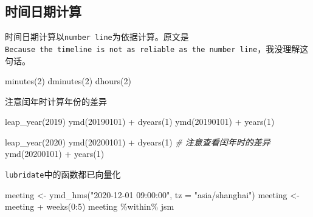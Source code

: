 \documentclass[
]{book}
\newenvironment{Shaded}{\begin{snugshade}}{\end{snugshade}}
\newcommand{\AttributeTok}[1]{\textcolor[rgb]{0.77,0.63,0.00}{#1}}
\newcommand{\CommentTok}[1]{\textcolor[rgb]{0.56,0.35,0.01}{\textit{#1}}}
\newcommand{\DecValTok}[1]{\textcolor[rgb]{0.00,0.00,0.81}{#1}}
\newcommand{\FunctionTok}[1]{\textcolor[rgb]{0.00,0.00,0.00}{#1}}
\newcommand{\NormalTok}[1]{#1}
\newcommand{\OtherTok}[1]{\textcolor[rgb]{0.56,0.35,0.01}{#1}}
\newcommand{\SpecialCharTok}[1]{\textcolor[rgb]{0.00,0.00,0.00}{#1}}
\newcommand{\StringTok}[1]{\textcolor[rgb]{0.31,0.60,0.02}{#1}}
\begin{document}
\hypertarget{ux65f6ux95f4ux65e5ux671fux8ba1ux7b97}{%
\subsection{时间日期计算}\label{ux65f6ux95f4ux65e5ux671fux8ba1ux7b97}}

时间日期计算以\texttt{number\ line}为依据计算。原文是\texttt{Because\ the\ timeline\ is\ not\ as\ reliable\ as\ the\ number\ line}，我没理解这句话。

\begin{Shaded}
\begin{Highlighting}[]
\FunctionTok{minutes}\NormalTok{(}\DecValTok{2}\NormalTok{)}
\FunctionTok{dminutes}\NormalTok{(}\DecValTok{2}\NormalTok{)}
\FunctionTok{dhours}\NormalTok{(}\DecValTok{2}\NormalTok{)}
\end{Highlighting}
\end{Shaded}

注意闰年时计算年份的差异

\begin{Shaded}
\begin{Highlighting}[]
\FunctionTok{leap\_year}\NormalTok{(}\DecValTok{2019}\NormalTok{)}
\FunctionTok{ymd}\NormalTok{(}\DecValTok{20190101}\NormalTok{) }\SpecialCharTok{+} \FunctionTok{dyears}\NormalTok{(}\DecValTok{1}\NormalTok{)}
\FunctionTok{ymd}\NormalTok{(}\DecValTok{20190101}\NormalTok{) }\SpecialCharTok{+} \FunctionTok{years}\NormalTok{(}\DecValTok{1}\NormalTok{)}

\FunctionTok{leap\_year}\NormalTok{(}\DecValTok{2020}\NormalTok{)}
\FunctionTok{ymd}\NormalTok{(}\DecValTok{20200101}\NormalTok{) }\SpecialCharTok{+} \FunctionTok{dyears}\NormalTok{(}\DecValTok{1}\NormalTok{)  }\CommentTok{\# 注意查看闰年时的差异}
\FunctionTok{ymd}\NormalTok{(}\DecValTok{20200101}\NormalTok{) }\SpecialCharTok{+} \FunctionTok{years}\NormalTok{(}\DecValTok{1}\NormalTok{)}
\end{Highlighting}
\end{Shaded}

\texttt{lubridate}中的函数都已向量化

\begin{Shaded}
\begin{Highlighting}[]
\NormalTok{meeting }\OtherTok{\textless{}{-}} \FunctionTok{ymd\_hms}\NormalTok{(}\StringTok{"2020{-}12{-}01 09:00:00"}\NormalTok{, }\AttributeTok{tz =} \StringTok{"asia/shanghai"}\NormalTok{)}
\NormalTok{meeting }\OtherTok{\textless{}{-}}\NormalTok{ meeting }\SpecialCharTok{+} \FunctionTok{weeks}\NormalTok{(}\DecValTok{0}\SpecialCharTok{:}\DecValTok{5}\NormalTok{)}
\NormalTok{meeting }\SpecialCharTok{\%within\%}\NormalTok{ jsm}
\end{Highlighting}
\end{Shaded}
\end{document}
